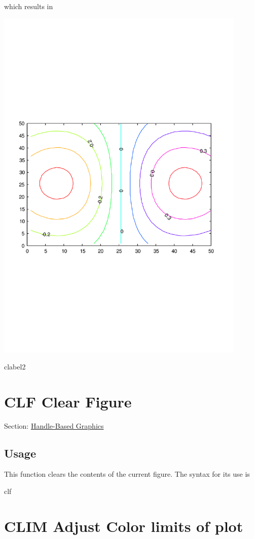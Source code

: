 which results in  
\begin{DoxyImage}
\includegraphics[width=12cm]{clabel2}
\caption{clabel2}
\end{DoxyImage}
 \hypertarget{handle_clf}{}\section{C\-L\-F Clear Figure}\label{handle_clf}
Section\-: \hyperlink{sec_handle}{Handle-\/\-Based Graphics} \hypertarget{vtkwidgets_vtkxyplotwidget_Usage}{}\subsection{Usage}\label{vtkwidgets_vtkxyplotwidget_Usage}
This function clears the contents of the current figure. The syntax for its use is \begin{DoxyVerb}   clf
\end{DoxyVerb}
 \hypertarget{handle_clim}{}\section{C\-L\-I\-M Adjust Color limits of plot}\label{handle_clim}
